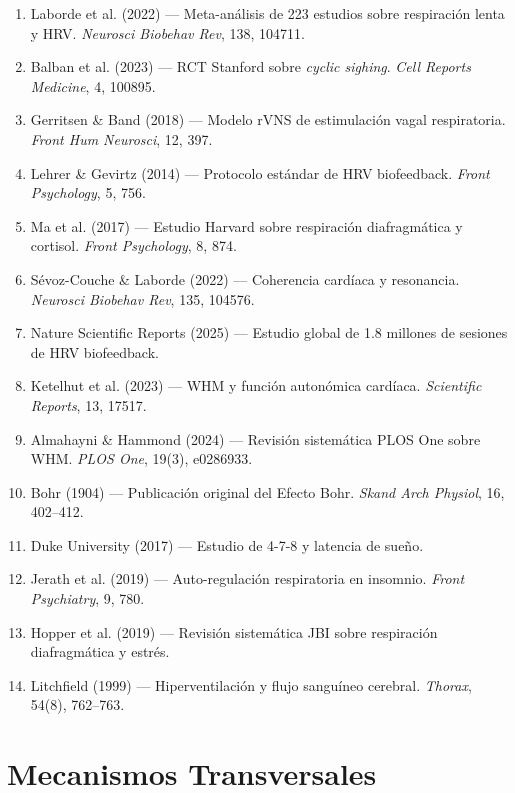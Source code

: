 \documentclass[12pt,a4paper]{article}
\begin{document}
\begin{enumerate}[itemsep=2pt]
    \item Laborde et al. (2022) — Meta-análisis de 223 estudios sobre
          respiración lenta y HRV. \textit{Neurosci Biobehav Rev}, 138, 104711.
    \item Balban et al. (2023) — RCT Stanford sobre \textit{cyclic sighing}.
          \textit{Cell Reports Medicine}, 4, 100895.
    \item Gerritsen \& Band (2018) — Modelo rVNS de estimulación vagal
          respiratoria. \textit{Front Hum Neurosci}, 12, 397.
    \item Lehrer \& Gevirtz (2014) — Protocolo estándar de HRV biofeedback.
          \textit{Front Psychology}, 5, 756.
    \item Ma et al. (2017) — Estudio Harvard sobre respiración diafragmática
          y cortisol. \textit{Front Psychology}, 8, 874.
    \item Sévoz-Couche \& Laborde (2022) — Coherencia cardíaca y resonancia.
          \textit{Neurosci Biobehav Rev}, 135, 104576.
    \item Nature Scientific Reports (2025) — Estudio global de 1.8 millones
          de sesiones de HRV biofeedback.
    \item Ketelhut et al. (2023) — WHM y función autonómica cardíaca.
          \textit{Scientific Reports}, 13, 17517.
    \item Almahayni \& Hammond (2024) — Revisión sistemática PLOS One sobre
          WHM. \textit{PLOS One}, 19(3), e0286933.
    \item Bohr (1904) — Publicación original del Efecto Bohr.
          \textit{Skand Arch Physiol}, 16, 402--412.
    \item Duke University (2017) — Estudio de 4-7-8 y latencia de sueño.
    \item Jerath et al. (2019) — Auto-regulación respiratoria en insomnio.
          \textit{Front Psychiatry}, 9, 780.
    \item Hopper et al. (2019) — Revisión sistemática JBI sobre respiración
          diafragmática y estrés.
    \item Litchfield (1999) — Hiperventilación y flujo sanguíneo cerebral.
          \textit{Thorax}, 54(8), 762--763.
\end{enumerate}

\newpage

\section{Mecanismos Transversales}
\end{document}
